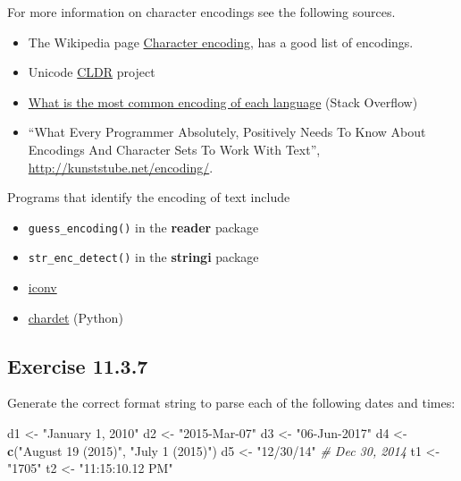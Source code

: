 \documentclass[]{book}
\newenvironment{Shaded}{\begin{snugshade}}{\end{snugshade}}
\newcommand{\CommentTok}[1]{\textcolor[rgb]{0.56,0.35,0.01}{\textit{#1}}}
\newcommand{\KeywordTok}[1]{\textcolor[rgb]{0.13,0.29,0.53}{\textbf{#1}}}
\newcommand{\NormalTok}[1]{#1}
\newcommand{\StringTok}[1]{\textcolor[rgb]{0.31,0.60,0.02}{#1}}
\providecommand{\tightlist}{%
  \setlength{\itemsep}{0pt}\setlength{\parskip}{0pt}}
\theoremstyle{plain}
\theoremstyle{remark}
\begin{document}
For more information on character encodings see the following sources.

\begin{itemize}
\tightlist
\item
  The Wikipedia page
  \href{https://en.wikipedia.org/wiki/Character_encoding}{Character
  encoding}, has a good list of encodings.
\item
  Unicode \href{http://cldr.unicode.org/}{CLDR} project
\item
  \href{https://stackoverflow.com/questions/8509339/what-is-the-most-common-encoding-of-each-language}{What
  is the most common encoding of each language} (Stack Overflow)
\item
  ``What Every Programmer Absolutely, Positively Needs To Know About
  Encodings And Character Sets To Work With Text'',
  \url{http://kunststube.net/encoding/}.
\end{itemize}

Programs that identify the encoding of text include

\begin{itemize}
\tightlist
\item
  \texttt{guess\_encoding()} in the \textbf{reader} package
\item
  \texttt{str\_enc\_detect()} in the \textbf{stringi} package
\item
  \href{https://en.wikipedia.org/wiki/Iconv}{iconv}
\item
  \href{https://github.com/chardet/chardet}{chardet} (Python)
\end{itemize}

\hypertarget{exercise-11.3.7}{%
\subsection*{\texorpdfstring{Exercise
{11.3.7}}{Exercise 11.3.7}}\label{exercise-11.3.7}}

Generate the correct format string to parse each of the following dates
and times:

\begin{Shaded}
\begin{Highlighting}[]
\NormalTok{d1 <-}\StringTok{ "January 1, 2010"}
\NormalTok{d2 <-}\StringTok{ "2015-Mar-07"}
\NormalTok{d3 <-}\StringTok{ "06-Jun-2017"}
\NormalTok{d4 <-}\StringTok{ }\KeywordTok{c}\NormalTok{(}\StringTok{"August 19 (2015)"}\NormalTok{, }\StringTok{"July 1 (2015)"}\NormalTok{)}
\NormalTok{d5 <-}\StringTok{ "12/30/14"} \CommentTok{# Dec 30, 2014}
\NormalTok{t1 <-}\StringTok{ "1705"}
\NormalTok{t2 <-}\StringTok{ "11:15:10.12 PM"}
\end{Highlighting}
\end{Shaded}
\end{document}
